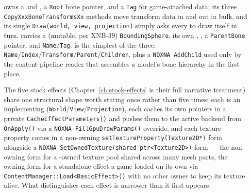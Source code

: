  owns a  and , a
\texttt{Root} bone pointer, and a \texttt{Tag} for game-attached data; its three
\texttt{CopyXxxBoneTransformsXx} methods move transform data in and out in bulk, and its single
\texttt{Draw(world, view, projection)} simply asks every  to draw itself in
turn.  carries a (mutable, per XNB-39) \texttt{BoundingSphere}, its own
, , a \texttt{ParentBone}
pointer, and \texttt{Name}/\texttt{Tag}.  is the simplest of the three:
\texttt{Name}/\texttt{Index}/\texttt{Transform}/\texttt{Parent}/\texttt{Children}, plus a
\texttt{NOXNA AddChild} used only by the content-pipeline reader that assembles a model's bone
hierarchy in the first place.

The five stock effects (Chapter~\ref{ch:stock-effects} is their full narrative treatment) share
one structural shape worth stating once rather than five times: each is an 
implementing  (\texttt{World}/\texttt{View}/\texttt{Projection}), each
caches its own  pointers in a private \texttt{CacheEffectParameters()}
and pushes them to the active backend from \texttt{OnApply()} via a \texttt{NOXNA
FillGpuDrawParams()} override, and each texture property comes in a non-owning
\texttt{setTextureProperty(Texture2D*)} form alongside a \texttt{NOXNA SetOwnedTexture(shared\_ptr<Texture2D>)}
form --- the non-owning form for a -owned texture pool shared across many mesh
parts, the owning form for a standalone effect a game loaded on its own via
\texttt{ContentManager::Load<BasicEffect>()} with no other owner to keep its texture alive. What
distinguishes each effect is narrower than it first appears:

